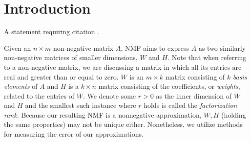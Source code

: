 \documentclass[
10pt, %
a4paper, %
oneside, %
headinclude,footinclude, %
BCOR5mm, %
]{scrartcl}
\begin{document}

\let\thefootnote\relax{}



\section{Introduction}

A statement requiring citation \cite{Figueredo:2009dg}.

Given an $n\times m$ non-negative matrix $A$, NMF aims to express $A$ as two similarly non-negative matrices of smaller dimensions, $W$ and $H$. Note that when referring to a non-negative matrix, we are discussing a matrix in which all its entries are real and greater than or equal to zero. $W$ is an $m\times k$ matrix consisting of $k$ \textit{basis elements} of $A$ and $H$ is a $k\times n$ matrix consisting of the coefficients, or \textit{weights}, related to the entries of $W$. We denote some $r>0$ as the inner dimension of $W$ and $H$ and the smallest such instance where $r$ holds is called the \emph{factorization rank}. Because our resulting NMF is a nonnegative approximation, $W,H$ (holding the same properties) may not be unique either. Nonetheless, we utilize methods for measuring the error of our approximations.

\end{document}
